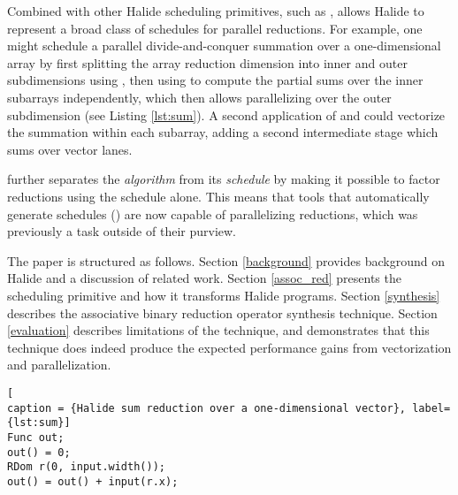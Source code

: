 Combined with other Halide scheduling primitives, such as ,  allows Halide to represent a broad class of schedules for parallel reductions. For example, one might schedule a parallel divide-and-conquer summation over a one-dimensional array by first splitting the array reduction dimension into inner and outer subdimensions using , then using  to compute the partial sums over the inner subarrays independently, which then allows parallelizing over the outer subdimension (see Listing \ref{lst:sum}). A second application of  and  could vectorize the summation within each subarray, adding a second intermediate stage which sums over vector lanes.

 further separates the \emph{algorithm} from its \emph{schedule} by making it possible to factor reductions using the schedule alone. This means that tools that automatically generate schedules (\cite{Mullapudi:2016:ASH:2897824.2925952}\cite{Ragan-Kelley:2013:HLC:2491956.2462176}) are now capable of parallelizing reductions, which was previously a task outside of their purview.


The paper is structured as follows. Section \ref{background} provides background on Halide and a discussion of related work. Section \ref{assoc_red} presents the  scheduling primitive and how it transforms Halide programs. Section \ref{synthesis} describes the associative binary reduction operator synthesis technique. Section \ref{evaluation} describes limitations of the technique, and demonstrates that this technique does indeed produce the expected performance gains from vectorization and parallelization.

\begin{lstlisting}[
caption = {Halide sum reduction over a one-dimensional vector}, label={lst:sum}]
Func out;
out() = 0;
RDom r(0, input.width());
out() = out() + input(r.x);
\end{lstlisting}

